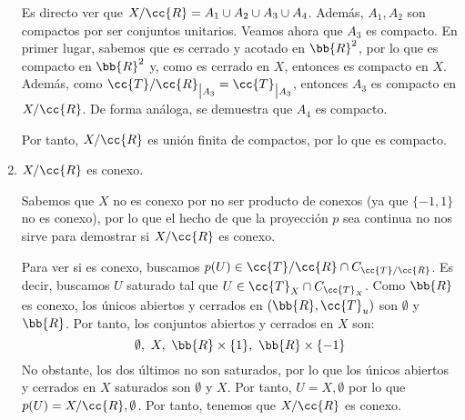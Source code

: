 \documentclass[12pt]{article}
\newcommand{\T}[0]{\cc{T}}
\begin{document}
\begin{ejercicio}[2.5 puntos]
\begin{enumerate}
            Es directo ver que $X/\cc{R} = A_1 \cup A_2 \cup A_3 \cup A_4$.
            Además, $A_1,A_2$ son compactos por ser conjuntos unitarios.
            Veamos ahora que $A_3$ es compacto. En primer lugar, sabemos que
            es cerrado y acotado en $\bb{R}^2$, por lo que es compacto en $\bb{R}^2$ y,
            como es cerrado en $X$, entonces es compacto en $X$. Además, como
            ${\T/\cc{R}}_{\big|A_3} = \T_{\big|A_3}$, entonces $A_3$ es compacto en
            $X/\cc{R}$. De forma análoga, se demuestra que $A_4$ es compacto.

            Por tanto, $X/\cc{R}$ es unión finita de compactos, por lo que es compacto.

            \item $X/\cc{R}$ es conexo.
            
            Sabemos que $X$ no es conexo por no ser producto de conexos (ya que $\{-1,1\}$ no es conexo),
            por lo que el hecho de que la proyección $p$ sea continua no nos sirve para demostrar si $X/\cc{R}$ es conexo.

            Para ver si es conexo, buscamos $p(U)\in \T/\cc{R}\cap C_{\T/\cc{R}}$.
            Es decir, buscamos $U$ saturado tal que $U\in \T_X\cap C_{\T_X}$.
            Como $\bb{R}$ es conexo, los únicos abiertos y cerrados en $(\bb{R}, \T_u)$ son $\emptyset$ y $\bb{R}$. Por tanto,
            los conjuntos abiertos y cerrados en $X$ son:
            \begin{equation*}
                \emptyset,~X,~\bb{R}\times \{1\},~\bb{R}\times \{-1\}
            \end{equation*}
            No obstante, los dos últimos no son saturados, por lo que
            los únicos abiertos y cerrados en $X$ saturados son $\emptyset$ y $X$.
            Por tanto, $U=X, \emptyset$ por lo que $p(U)=X/\cc{R}, \emptyset$.
            Por tanto, tenemos que $X/\cc{R}$ es conexo.
        \end{enumerate}
    \end{ejercicio}
\end{document}
